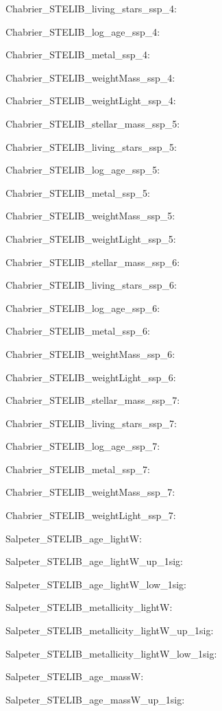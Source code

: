 \item Chabrier\_STELIB\_living\_stars\_ssp\_4: 
\item Chabrier\_STELIB\_log\_age\_ssp\_4: 
\item Chabrier\_STELIB\_metal\_ssp\_4: 
\item Chabrier\_STELIB\_weightMass\_ssp\_4: 
\item Chabrier\_STELIB\_weightLight\_ssp\_4: 
\item Chabrier\_STELIB\_stellar\_mass\_ssp\_5: 
\item Chabrier\_STELIB\_living\_stars\_ssp\_5: 
\item Chabrier\_STELIB\_log\_age\_ssp\_5: 
\item Chabrier\_STELIB\_metal\_ssp\_5: 
\item Chabrier\_STELIB\_weightMass\_ssp\_5: 
\item Chabrier\_STELIB\_weightLight\_ssp\_5: 
\item Chabrier\_STELIB\_stellar\_mass\_ssp\_6: 
\item Chabrier\_STELIB\_living\_stars\_ssp\_6: 
\item Chabrier\_STELIB\_log\_age\_ssp\_6: 
\item Chabrier\_STELIB\_metal\_ssp\_6: 
\item Chabrier\_STELIB\_weightMass\_ssp\_6: 
\item Chabrier\_STELIB\_weightLight\_ssp\_6: 
\item Chabrier\_STELIB\_stellar\_mass\_ssp\_7: 
\item Chabrier\_STELIB\_living\_stars\_ssp\_7: 
\item Chabrier\_STELIB\_log\_age\_ssp\_7: 
\item Chabrier\_STELIB\_metal\_ssp\_7: 
\item Chabrier\_STELIB\_weightMass\_ssp\_7: 
\item Chabrier\_STELIB\_weightLight\_ssp\_7: 
\item Salpeter\_STELIB\_age\_lightW: 
\item Salpeter\_STELIB\_age\_lightW\_up\_1sig: 
\item Salpeter\_STELIB\_age\_lightW\_low\_1sig: 
\item Salpeter\_STELIB\_metallicity\_lightW: 
\item Salpeter\_STELIB\_metallicity\_lightW\_up\_1sig: 
\item Salpeter\_STELIB\_metallicity\_lightW\_low\_1sig: 
\item Salpeter\_STELIB\_age\_massW: 
\item Salpeter\_STELIB\_age\_massW\_up\_1sig: 
